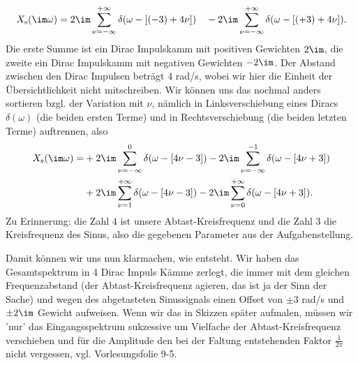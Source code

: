 \begin{ExCalc}
\begin{equation}
X_\mathrm{s}(\im\omega) = 2\im
\sum_{\nu=-\infty}^{+\infty} \delta(\omega - [(-3)+4\nu])
\quad-
2\im
\sum_{\nu=-\infty}^{+\infty} \delta(\omega - [(+3)+4\nu]).
\end{equation}
Die erste Summe ist ein Dirac Impulskamm mit positiven Gewichten $2\im$, die
zweite ein Dirac Impulskamm mit negativen Gewichten $-2\im$. Der Abstand zwischen
den Dirac Impulsen beträgt $4$ rad/s, wobei wir hier die Einheit der
Übersichtlichkeit nicht mitschreiben.
%
Wir können uns das nochmal anders sortieren bzgl. der Variation mit $\nu$,
nämlich in Linksverschiebung eines Diracs $\delta(\omega)$
(die beiden ersten Terme) und in Rechtsverschiebung
(die beiden letzten Terme) auftrennen, also
\begin{align}
X_\mathrm{s}(\im\omega) =
&+2\im\sum_{\nu=-\infty}^{0} \delta(\omega - [4\nu-3])
-2\im\sum_{\nu=-\infty}^{-1} \delta(\omega - [4\nu+3])\\
&+2\im\sum_{\nu=1}^{+\infty} \delta(\omega - [4\nu-3])
-2\im\sum_{\nu=0}^{+\infty} \delta(\omega - [4\nu+3]).
\end{align}
Zu Erinnerung: die Zahl $4$ ist unsere Abtast-Kreisfrequenz und die Zahl $3$
die Kreisfrequenz des Sinus, also die gegebenen Parameter aus der Aufgabenstellung.

Damit können wir uns nun klarmachen, wie
 entsteht. Wir haben das Gesamtspektrum
in 4 Dirac Impuls Kämme zerlegt, die immer mit dem gleichen Frequenzabstand
(der Abtast-Kreisfrequenz agieren, das ist ja der Sinn der Sache) und wegen
des abgetasteten Sinussignals einen Offset von $\pm 3$ rad/s und $\pm 2\im$ Gewicht
aufweisen.
Wenn wir das in Skizzen später aufmalen, müssen wir 'nur' das Eingangsspektrum
sukzessive um Vielfache der Abtast-Kreisfrequenz verschieben und für die Amplitude
den bei der Faltung entstehenden Faktor $\frac{1}{2\pi}$ nicht vergessen, vgl.
Vorlesungsfolie 9-5.
\end{ExCalc}
